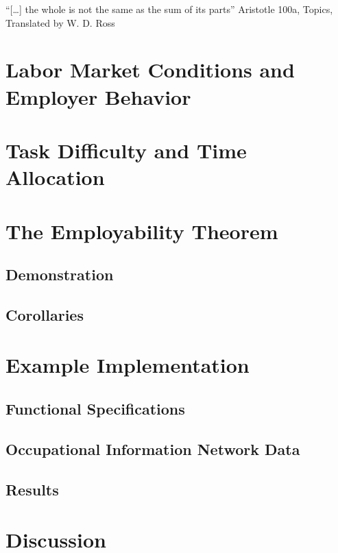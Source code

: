 \documentclass[hidelinks, nonatbib]{elsarticle}
\begin{document}
``[\dots] the whole is not the same as the sum of its parts''
Aristotle 100a, Topics, Translated by W. D. Ross
\OCL

\section{Labor Market Conditions and Employer Behavior}
\RA
\HA
\OEL
\LMCA

\section{Task Difficulty and Time Allocation}
\TDA


\section{The Employability Theorem}
\subsection{Demonstration}
\PET

\subsection{Corollaries}
\AEC

\OCC

\ACC


\section{Example Implementation}
\subsection{Functional Specifications}
\subsection{Occupational Information Network Data}
\subsection{Results}


\section{Discussion}
\end{document}
